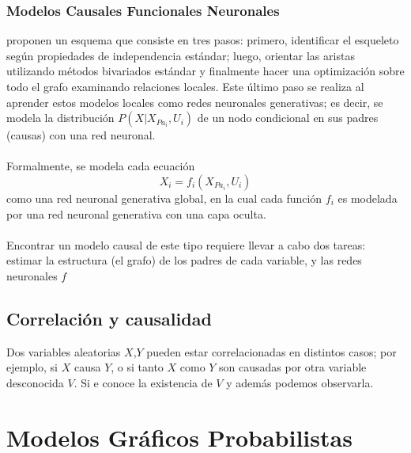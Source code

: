\documentclass[11pt]{article}
\theoremstyle{plain}
\begin{document}
\subsubsection{Modelos Causales Funcionales Neuronales}
\cite{goudet2017learning} proponen un esquema que consiste en tres pasos: primero, identificar el esqueleto según propiedades de independencia estándar; luego, orientar las aristas utilizando métodos bivariados estándar y finalmente hacer una optimización sobre todo el grafo examinando relaciones locales. Este último paso se realiza al aprender estos modelos locales como redes neuronales generativas; es decir, se modela la distribución $P(X | X_{Pa_i}, U_i)$ de un nodo condicional en sus padres (causas) con una red neuronal.\\
\\
Formalmente, se modela cada ecuación
\[X_i = f_i (X_{Pa_i},U_i) \]
como una red neuronal generativa global, en la cual cada función $f_i$ es modelada por una red neuronal generativa con una capa oculta.\\
\\
Encontrar un modelo causal de este tipo requiere llevar a cabo dos tareas: estimar la estructura (el grafo) de los padres de cada variable, y las redes neuronales $f$
\subsection{Correlación y causalidad}
Dos variables aleatorias $X$,$Y$ pueden estar correlacionadas en distintos casos; por ejemplo, si $X$ causa $Y$, o si tanto $X$ como $Y$ son causadas por otra variable desconocida $V$. Si e conoce la existencia de $V$ y además podemos observarla. 

\section{Modelos Gráficos Probabilistas}
\end{document}
